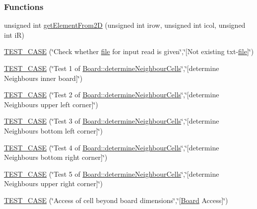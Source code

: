\subsubsection*{Functions}
\begin{DoxyCompactItemize}
\item 
unsigned int \hyperlink{a00109_a5e575afd978c261dd5973eaa88c3620f}{get\+Element\+From2\+D} (unsigned int irow, unsigned int icol, unsigned int i\+R)
\item 
\hyperlink{a00109_a978dfdd6632a3dbbc8bce475b8f50f6c}{T\+E\+S\+T\+\_\+\+C\+A\+S\+E} (\char`\"{}Check whether \hyperlink{a00114_afb14c82a145a51f20aea2593e1d84b86}{file} for input read is given\char`\"{},\char`\"{}\mbox{[}Not existing txt-\/\hyperlink{a00114_afb14c82a145a51f20aea2593e1d84b86}{file}\mbox{]}\char`\"{})
\item 
\hyperlink{a00109_ac6ba53c30c719442f5bcb85d55de175d}{T\+E\+S\+T\+\_\+\+C\+A\+S\+E} (\char`\"{}Test 1 of \hyperlink{a00009_aba3e60929ecd1a1867118e907c2078af}{Board\+::determine\+Neighbour\+Cells}\char`\"{},\char`\"{}\mbox{[}determine Neighbours inner board\mbox{]}\char`\"{})
\item 
\hyperlink{a00109_ac7b7e4ceb2d0b87b9f2a76ec252424d8}{T\+E\+S\+T\+\_\+\+C\+A\+S\+E} (\char`\"{}Test 2 of \hyperlink{a00009_aba3e60929ecd1a1867118e907c2078af}{Board\+::determine\+Neighbour\+Cells}\char`\"{},\char`\"{}\mbox{[}determine Neighbours upper left corner\mbox{]}\char`\"{})
\item 
\hyperlink{a00109_aedff4155768550d56d5313f2c6fd5937}{T\+E\+S\+T\+\_\+\+C\+A\+S\+E} (\char`\"{}Test 3 of \hyperlink{a00009_aba3e60929ecd1a1867118e907c2078af}{Board\+::determine\+Neighbour\+Cells}\char`\"{},\char`\"{}\mbox{[}determine Neighbours bottom left corner\mbox{]}\char`\"{})
\item 
\hyperlink{a00109_ad39ff6af2b36538aa09074809b6709dc}{T\+E\+S\+T\+\_\+\+C\+A\+S\+E} (\char`\"{}Test 4 of \hyperlink{a00009_aba3e60929ecd1a1867118e907c2078af}{Board\+::determine\+Neighbour\+Cells}\char`\"{},\char`\"{}\mbox{[}determine Neighbours bottom right corner\mbox{]}\char`\"{})
\item 
\hyperlink{a00109_a1f65531b6b3a1c53a05883c7eab3c2e3}{T\+E\+S\+T\+\_\+\+C\+A\+S\+E} (\char`\"{}Test 5 of \hyperlink{a00009_aba3e60929ecd1a1867118e907c2078af}{Board\+::determine\+Neighbour\+Cells}\char`\"{},\char`\"{}\mbox{[}determine Neighbours upper right corner\mbox{]}\char`\"{})
\item 
\hyperlink{a00109_a54c99047bc01791a779fb69e800c55ed}{T\+E\+S\+T\+\_\+\+C\+A\+S\+E} (\char`\"{}Access of cell beyond board dimensions\char`\"{},\char`\"{}\mbox{[}\hyperlink{a00009}{Board} Access\mbox{]}\char`\"{})

\end{DoxyCompactItemize}
